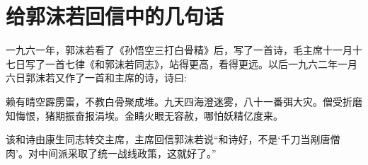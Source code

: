 \section[给郭沫若回信中的几句话（一九六二年一月）]{给郭沫若回信中的几句话}


一九六一年，郭沫若看了《孙悟空三打白骨精》后，写了一首诗，毛主席十一月十七日写了一首七律《和郭沫若同志》，站得更高，看得更远。以后一九六二年一月六日郭沫若又作了一首和主席的诗，诗曰:

赖有晴空霹雳雷，不教白骨聚成堆。九天四海澄迷雾，八十一番弭大灾。僧受折磨知悔恨，猪期振奋报涓埃。金睛火眼无容赦，哪怕妖精亿度来。

该和诗由康生同志转交主席，主席回信郭沫若说“和诗好，不是‘千刀当剐唐僧肉’。对中间派采取了统一战线政策，这就好了。”


